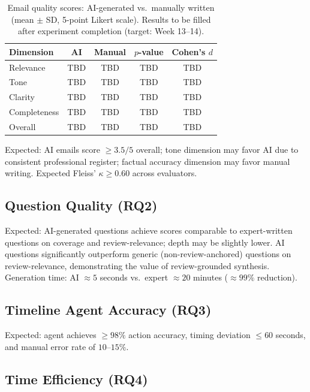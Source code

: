 \documentclass[runningheads]{llncs}
\begin{document}
\begin{table}[t]
\caption{Email quality scores: AI-generated vs.\ manually written (mean $\pm$ SD, 5-point Likert scale). Results to be filled after experiment completion (target: Week 13--14).}\label{tab:email_quality}
\begin{tabular}{lcccc}
\toprule
\textbf{Dimension} & \textbf{AI} & \textbf{Manual} & \textbf{$p$-value} & \textbf{Cohen's $d$} \\
\midrule
Relevance      & TBD & TBD & TBD & TBD \\
Tone           & TBD & TBD & TBD & TBD \\
Clarity        & TBD & TBD & TBD & TBD \\
Completeness   & TBD & TBD & TBD & TBD \\
Overall        & TBD & TBD & TBD & TBD \\
\bottomrule
\end{tabular}
\end{table}

Expected: AI emails score $\geq 3.5/5$ overall; tone dimension may favor AI due to consistent professional register; factual accuracy dimension may favor manual writing. Expected Fleiss' $\kappa \geq 0.60$ across evaluators.

\subsection{Question Quality (RQ2)}

Expected: AI-generated questions achieve scores comparable to expert-written questions on coverage and review-relevance; depth may be slightly lower. AI questions significantly outperform generic (non-review-anchored) questions on review-relevance, demonstrating the value of review-grounded synthesis. Generation time: AI $\approx 5$ seconds vs.\ expert $\approx 20$ minutes ($\approx 99\%$ reduction).

\subsection{Timeline Agent Accuracy (RQ3)}

Expected: agent achieves $\geq 98\%$ action accuracy, timing deviation $\leq 60$ seconds, and manual error rate of $10$--$15\%$.

\subsection{Time Efficiency (RQ4)}
\end{document}
